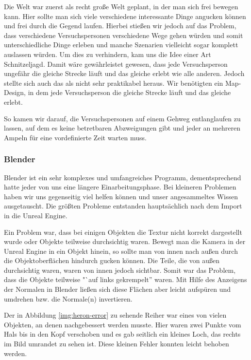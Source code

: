 \documentclass{Bericht}
\begin{document}
		Die Welt war zuerst als recht große Welt geplant, in der man sich frei bewegen kann. Hier sollte man sich viele verschiedene interessante Dinge angucken können und frei durch die Gegend laufen. Hierbei stießen wir jedoch auf das Problem, dass verschiedene Versuchspersonen verschiedene Wege gehen würden und somit unterschiedliche Dinge erleben und manche Szenarien vielleicht sogar komplett auslassen würden. Um dies zu verhindern, kam uns die Idee einer Art Schnitzeljagd. Damit wäre gewährleistet gewesen, dass jede Versuchsperson ungefähr die gleiche Strecke läuft und das gleiche erlebt wie alle anderen. Jedoch stellte sich auch das als nicht sehr praktikabel heraus. Wir benötigten ein Map-Design, in dem jede Versuchsperson die gleiche Strecke läuft und das gleiche erlebt.

		So kamen wir darauf, die Versuchspersonen auf einem Gehweg entlanglaufen zu lassen, auf dem es keine betretbaren Abzweigungen gibt und jeder an mehreren Ampeln für eine vordefinierte Zeit warten muss. 
		
		\subsubsection{Blender}
			Blender ist ein sehr komplexes und umfangreiches Programm, dementsprechend hatte jeder von uns eine längere Einarbeitungsphase. Bei kleineren Problemen haben wir uns gegenseitig viel helfen können und unser angesammeltes Wissen ausgetauscht. Die größten Probleme entstanden hauptsächlich nach dem Import in die Unreal Engine. 

			Ein Problem war, dass bei einigen Objekten die Textur nicht korrekt dargestellt wurde oder Objekte teilweise durchsichtig waren. Bewegt man die Kamera in der Unreal Engine in ein Objekt hinein, so sollte man von innen nach außen durch die Objektoberflächen hindurch gucken können. Die Teile, die von außen durchsichtig waren, waren von innen jedoch sichtbar. Somit war das Problem, dass die Objekte teilweise "`auf links gekrempelt'' waren. Mit Hilfe des Anzeigens der Normalen in Blender ließen sich diese Flächen aber leicht aufspüren und umdrehen bzw. die Normale(n) invertieren.
			
			Der in Abbildung \ref{img:heron-error} zu sehende Reiher war eines von vielen Objekten, an denen nachgebessert werden musste. Hier waren zwei Punkte vom Hals bis in den Kopf verschoben und es gab seitlich ein kleines Loch, das rechts im Bild umrandet zu sehen ist. Diese kleinen Fehler konnten leicht behoben werden. 
\end{document}
